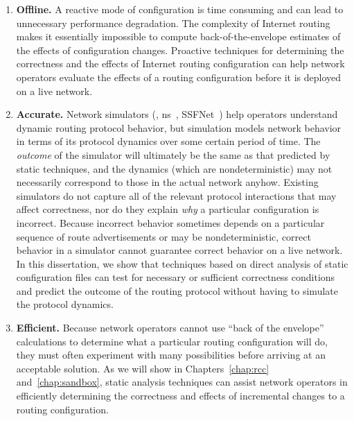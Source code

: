 \begin{enumerate}
\itemsep=-1pt
\item {\bf Offline.}  A reactive mode of configuration is time consuming
and can lead to unnecessary performance degradation.  The complexity of
Internet routing makes it essentially impossible to compute
back-of-the-envelope estimates of the effects of configuration changes.
Proactive techniques for determining the correctness and the effects of
Internet routing configuration can help network operators evaluate the
effects of a routing configuration before it is deployed on a live
network.

\item {\bf Accurate.}  Network simulators (\eg,
ns~\cite{www-ns-bgp}, SSFNet~\cite{www-ssfnet}) help operators
understand dynamic routing protocol behavior, but simulation models
network behavior in terms of its protocol dynamics over some certain
period of time.  The {\em outcome} of the simulator will ultimately be
the same as that predicted by static techniques, and the dynamics (which
are nondeterministic) may not necessarily correspond to those in the
actual network anyhow.  Existing simulators do not capture all of the
relevant protocol interactions that may affect correctness, nor do they
explain {\em why} a particular configuration is incorrect.  Because
incorrect behavior sometimes depends on a particular sequence of route
advertisements or may be nondeterministic, correct behavior in a
simulator cannot guarantee correct behavior on a live network.  In this
dissertation, we show that techniques based on direct analysis of static
configuration files can test for necessary or sufficient correctness
conditions and predict the outcome of the routing protocol without
having to simulate the protocol dynamics.



\item {\bf Efficient.}  Because network operators cannot use ``back of the
envelope'' calculations to determine what a particular routing
configuration will do, they must often experiment with many
possibilities before arriving at an acceptable solution.  As we will
show in Chapters~\ref{chap:rcc} and~\ref{chap:sandbox}, static analysis
techniques can assist network operators in efficiently determining the
correctness and effects of incremental changes to a routing
configuration.


\end{enumerate}

